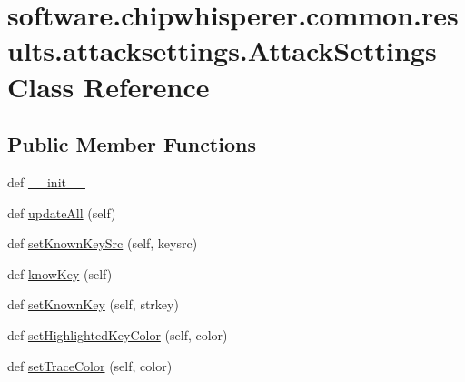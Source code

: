 \hypertarget{classsoftware_1_1chipwhisperer_1_1common_1_1results_1_1attacksettings_1_1AttackSettings}{}\section{software.\+chipwhisperer.\+common.\+results.\+attacksettings.\+Attack\+Settings Class Reference}
\label{classsoftware_1_1chipwhisperer_1_1common_1_1results_1_1attacksettings_1_1AttackSettings}
\subsection*{Public Member Functions}
\begin{DoxyCompactItemize}
\item 
def \hyperlink{classsoftware_1_1chipwhisperer_1_1common_1_1results_1_1attacksettings_1_1AttackSettings_a48cfd1ae6ea1de134761c447b27a188d}{\+\_\+\+\_\+init\+\_\+\+\_\+}
\item 
def \hyperlink{classsoftware_1_1chipwhisperer_1_1common_1_1results_1_1attacksettings_1_1AttackSettings_a9ffc39a805f5cb6e702b77053e87fef0}{update\+All} (self)
\item 
def \hyperlink{classsoftware_1_1chipwhisperer_1_1common_1_1results_1_1attacksettings_1_1AttackSettings_a9220b52e325473d912ee1681acb865e3}{set\+Known\+Key\+Src} (self, keysrc)
\item 
def \hyperlink{classsoftware_1_1chipwhisperer_1_1common_1_1results_1_1attacksettings_1_1AttackSettings_ab3fb7fa7cac309cc99d74d0112937c17}{know\+Key} (self)
\item 
def \hyperlink{classsoftware_1_1chipwhisperer_1_1common_1_1results_1_1attacksettings_1_1AttackSettings_a7fa9dc1220c39fc1c76c43adae42236e}{set\+Known\+Key} (self, strkey)
\item 
def \hyperlink{classsoftware_1_1chipwhisperer_1_1common_1_1results_1_1attacksettings_1_1AttackSettings_a4afa93bdd0f8bf163a17f2ea439c9975}{set\+Highlighted\+Key\+Color} (self, color)
\item 
def \hyperlink{classsoftware_1_1chipwhisperer_1_1common_1_1results_1_1attacksettings_1_1AttackSettings_ae1efe16c8ea46c9d7619d5a4029431e3}{set\+Trace\+Color} (self, color)
\end{DoxyCompactItemize}


